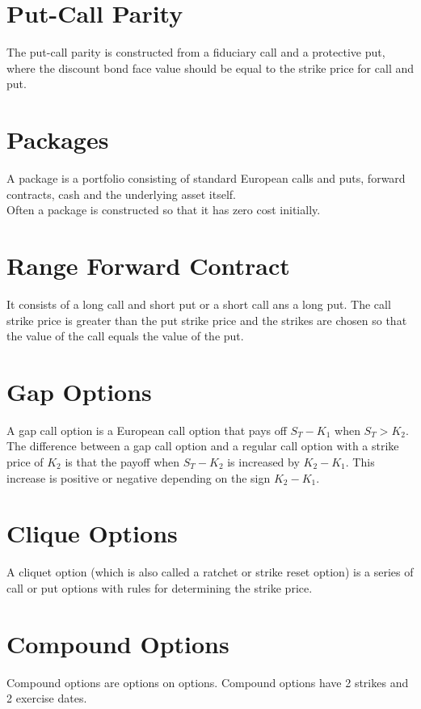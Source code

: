\section{Put-Call Parity}
The put-call parity is constructed from a fiduciary call and a protective put, where the discount bond face value should be equal to the strike price for call and put.

\section{Packages}
A package is a portfolio consisting of standard European calls and puts, forward contracts, cash and the underlying asset itself.\\
Often a package is constructed so that it has zero cost initially. 

\section{Range Forward Contract}
It consists of a long call and short put or a short call ans a long put. The call strike price is greater than the put strike price and the strikes are chosen so that the value of the call equals the value of the put.

\section{Gap Options}
A gap call option is a European call option that pays off $S_{T} - K_{1}$ when $S_{T} > K_{2}$.\\
The difference between a gap call option and a regular call option with a strike price of $K_{2}$ is that the payoff when $S_{T} - K_{2}$ is increased by $K_{2} - K_{1}$. This increase is positive or negative depending on the sign $K_{2} - K_{1}$.

\section{Clique Options}
A cliquet option (which is also called a ratchet or strike reset option) is a series of call or put options with rules for determining the strike price.

\section{Compound Options}
Compound options are options on options. Compound options have 2 strikes and 2 exercise dates.

